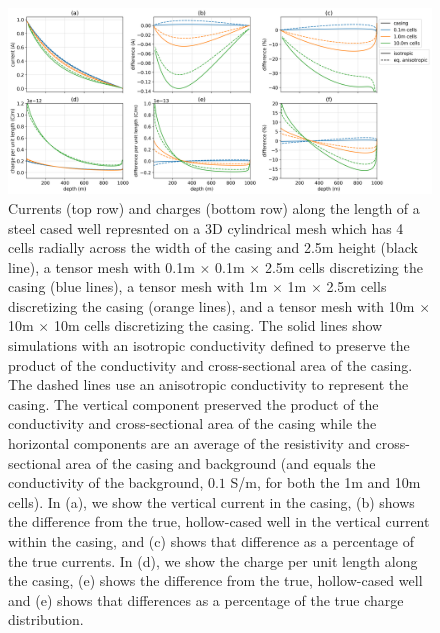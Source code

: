 \begin{figure}
    \begin{center}
    \includegraphics[width=\textwidth]{figures/approximating_wells_cartesian.png}
    \end{center}
\caption{
    Currents (top row) and charges (bottom row) along the length of
    a steel cased well represnted on a 3D cylindrical mesh which has
    4 cells radially across the width of the casing and 2.5m height (black line),
    a tensor mesh with 0.1m $\times$ 0.1m $\times$ 2.5m cells discretizing the casing (blue lines),
    a tensor mesh with 1m $\times$ 1m $\times$ 2.5m cells discretizing the casing (orange lines),
    and a tensor mesh with 10m $\times$ 10m $\times$ 10m cells discretizing the casing.
    The solid lines show simulations with an isotropic conductivity defined to preserve the
    product of the conductivity and cross-sectional area of the casing. The dashed lines
    use an anisotropic conductivity to represent the casing. The vertical component preserved the product
    of the conductivity and cross-sectional area of the casing while the horizontal components are an
    average of the resistivity and cross-sectional area of the casing and background
    (and equals the conductivity of the background, $0.1$ S/m, for both the 1m and 10m cells).
    In (a), we show the vertical current in the casing,
    (b) shows the difference from the true, hollow-cased well
    in the vertical current within the casing, and (c) shows that difference as a percentage
    of the true currents. In (d), we show the charge per unit length along the casing, (e)
    shows the difference from the true, hollow-cased well and (e) shows that differences as
    a percentage of the true charge distribution.
}
\label{fig:approximating_wells_cartesian}
\end{figure}
